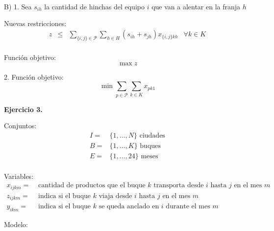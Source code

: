 \documentclass[a4paper,oneside,12pt]{amsart}
\def \ds{\displaystyle}
\begin{document}
B) 1. Sea $s_{ih}$ la cantidad de hinchas del equipo $i$ que van a alentar en la franja $h$

Nuevas restricciones:
\[
\begin{array}{rclr}
    z & \leq & \ds\sum_{\{i,j\}\in\mathcal{P}}\ds\sum_{h\in H}(s_{ih} + s_{jh})x_{\{i,j\}kh} & \forall k\in K \\
     & 
\end{array}
\]

Función objetivo:
\[\max z\]

2. Función objetivo:
\[ \min \ds\sum_{p\in\mathcal{P}}\sum_{k\in K} x_{pk1}\]

\newpage

\textbf{Ejercicio 3.}

Conjuntos:
\[
\begin{array}{rl}
    I= & \{1,\dots, N\} \text{ ciudades} \\
    B= & \{1, \dots, K\} \text{ buques} \\
    E= & \{1, \dots, 24\} \text{ meses}\\
\end{array}
\]

Variables:
\[
\begin{array}{rl}
    x_{ijkm}= & \text{ cantidad de productos que el buque $k$ transporta desde $i$ hasta $j$ en el mes $m$}  \\
    z_{ijkm} = & \text{ indica si el buque $k$ viaja desde $i$ hasta $j$ en el mes $m$} \\
    y_{ikm}= & \text{ indica si el buque $k$ se queda anclado en $i$ durante el mes $m$} 
\end{array}
\]

Modelo:
\end{document}
